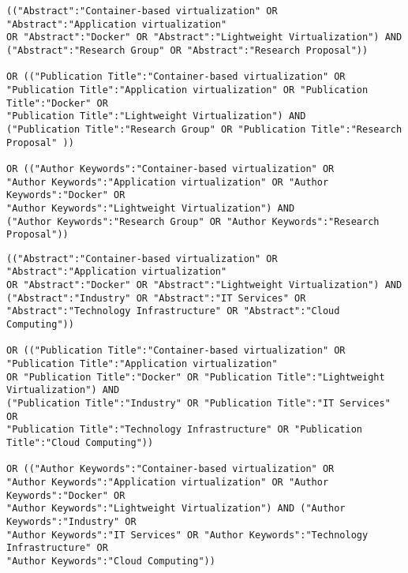 \begin{tcolorbox}[
  colback=gray!5, 
  colframe=black!60, 
  title=Cadena de búsqueda en IEE para investigación, 
  fonttitle=\bfseries, 
  sharp corners=south
]
\scriptsize %
\begin{verbatim}
(("Abstract":"Container-based virtualization" OR "Abstract":"Application virtualization" 
OR "Abstract":"Docker" OR "Abstract":"Lightweight Virtualization") AND 
("Abstract":"Research Group" OR "Abstract":"Research Proposal")) 

OR (("Publication Title":"Container-based virtualization" OR 
"Publication Title":"Application virtualization" OR "Publication Title":"Docker" OR 
"Publication Title":"Lightweight Virtualization") AND 
("Publication Title":"Research Group" OR "Publication Title":"Research Proposal" ))

OR (("Author Keywords":"Container-based virtualization" OR 
"Author Keywords":"Application virtualization" OR "Author Keywords":"Docker" OR 
"Author Keywords":"Lightweight Virtualization") AND 
("Author Keywords":"Research Group" OR "Author Keywords":"Research Proposal"))
\end{verbatim}
\end{tcolorbox}

\begin{tcolorbox}[
  colback=gray!5, 
  colframe=black!60, 
  title=Cadena de búsqueda en IEE para industria, 
  fonttitle=\bfseries, 
  sharp corners=south
]
\scriptsize %
\begin{verbatim}
(("Abstract":"Container-based virtualization" OR "Abstract":"Application virtualization" 
OR "Abstract":"Docker" OR "Abstract":"Lightweight Virtualization") AND 
("Abstract":"Industry" OR "Abstract":"IT Services" OR 
"Abstract":"Technology Infrastructure" OR "Abstract":"Cloud Computing")) 

OR (("Publication Title":"Container-based virtualization" OR 
"Publication Title":"Application virtualization" 
OR "Publication Title":"Docker" OR "Publication Title":"Lightweight Virtualization") AND 
("Publication Title":"Industry" OR "Publication Title":"IT Services" OR 
"Publication Title":"Technology Infrastructure" OR "Publication Title":"Cloud Computing"))

OR (("Author Keywords":"Container-based virtualization" OR 
"Author Keywords":"Application virtualization" OR "Author Keywords":"Docker" OR 
"Author Keywords":"Lightweight Virtualization") AND ("Author Keywords":"Industry" OR 
"Author Keywords":"IT Services" OR "Author Keywords":"Technology Infrastructure" OR 
"Author Keywords":"Cloud Computing"))
\end{verbatim}
\end{tcolorbox}

